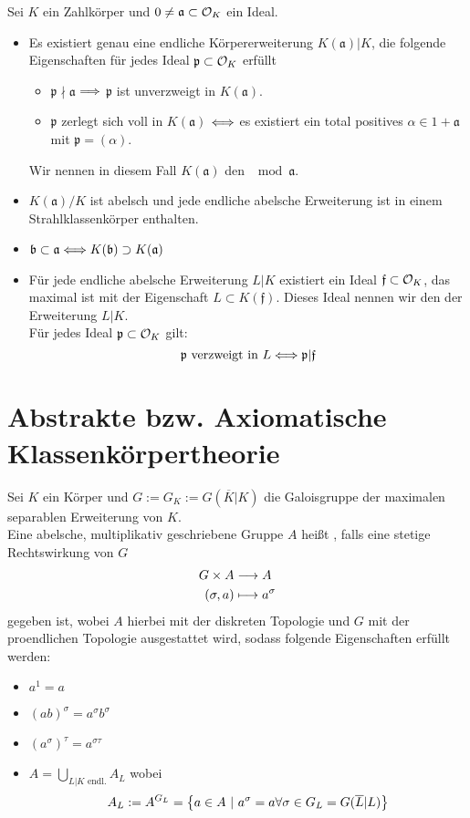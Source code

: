 \documentclass{book}
\newcommand{\af}{\mathfrak{a}}
\renewcommand{\bf}{\mathfrak{b}}
\newcommand{\ff}{\mathfrak{f}}
\newcommand{\pf}{\mathfrak{p}}
\begin{document}
Sei $K$ ein Zahlkörper und $0\neq \af \subset \O_K$ ein Ideal.
\begin{itemize}
\item Es existiert genau eine endliche Körpererweiterung $K(\af)|K$, die folgende Eigenschaften für jedes Ideal $\pf \subset \O_K$ erfüllt
\begin{itemize}
\item $\pf\nmid \af$ $\overset{}{\Longrightarrow}$ $\pf$ ist unverzweigt in $K(\af)$.
\item $\pf$ zerlegt sich voll in $K(\af)$ $\overset{}{\Longleftrightarrow}$ es existiert ein total positives $\alpha \in 1 + \af$ mit $\pf = (\alpha)$.
\end{itemize}
Wir nennen in diesem Fall $K(\af)$ den  $\mod{\af}$.
\item $K(\af) /K$ ist abelsch und jede endliche abelsche Erweiterung ist in einem Strahlklassenkörper enthalten.
\item $\bf \subset \af \Gdw{} K(\bf) \supset K(\af)$
\item Für jede endliche abelsche Erweiterung $L|K$ existiert ein Ideal $\ff \subset \O_K$, das maximal ist mit der Eigenschaft $L\subset K(\ff)$. Dieses Ideal nennen wir den  der Erweiterung $L|K$.\\
Für jedes Ideal $\pf \subset \O_K$ gilt:
\[ \pf \text{ verzweigt in } L \Gdw{} \pf | \ff \] 
\end{itemize}

\newpage
\section{Abstrakte bzw. Axiomatische Klassenkörpertheorie}
Sei $K$ ein Körper und $G := G_K := G(\overline{K}|K)$ die Galoisgruppe der maximalen separablen Erweiterung von $K$.\\
Eine abelsche, multiplikativ geschriebene Gruppe $A$ heißt , falls eine stetige Rechtswirkung von $G$
\begin{align*}
G \times A & \overset{}{\longrightarrow} A\\
(\sigma, a) & \longmapsto a^\sigma
\end{align*}
gegeben ist, wobei $A$ hierbei mit der diskreten Topologie und $G$ mit der proendlichen Topologie ausgestattet wird, sodass folgende Eigenschaften erfüllt werden:
\begin{itemize}
\item $a^1 = a$
\item $(ab)^\sigma = a^\sigma b^\sigma$
\item $(a^\sigma)^\tau = a^{\sigma\tau}$
\item $A = \bigcup_{L|K \text{ endl.}}A_L$ wobei
\[A_L := A^{G_L} = \set{a\in A}{a^\sigma = a \forall \sigma \in G_L = G(\overline{L}|L)}\]
\end{itemize} 
\end{document}

